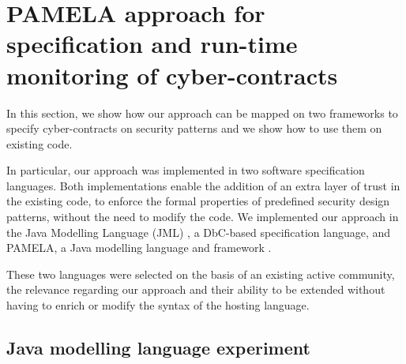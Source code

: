 
\section{PAMELA approach for specification and run-time monitoring of cyber-contracts}

In this section, we show how our approach can be mapped on two frameworks to specify cyber-contracts on security patterns and we show how to use them on existing code.

In particular, our approach was implemented in two software specification languages. Both implementations enable the addition of an extra layer of trust in the existing code, to enforce the formal properties of predefined security design patterns, without the need to modify the code. We implemented our approach in the Java Modelling Language (JML) \cite{leavens2006}, a DbC-based specification language, and PAMELA, a Java modelling language and framework \cite{PAMELAWebSite}.

These two languages were selected on the basis of an existing active community, the relevance regarding our approach and their ability to be extended without having to enrich or modify the syntax of the hosting language.

\subsection{Java modelling language experiment}

